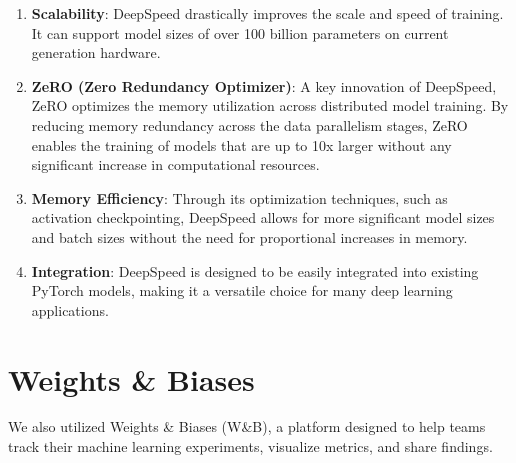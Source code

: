 \documentclass[\main/thesis.tex]{subfiles}
\begin{document}
\begin{enumerate}
    \item \textbf{Scalability}: DeepSpeed drastically improves the scale and speed of training. It can support 
    model sizes of over 100 billion parameters on current generation hardware.
    
    \item \textbf{ZeRO (Zero Redundancy Optimizer)}: A key innovation of DeepSpeed, ZeRO optimizes the memory utilization across 
    distributed model training. By reducing memory redundancy across the data parallelism stages, ZeRO enables the training of models 
    that are up to 10x larger without any significant increase in computational resources.
    
    \item \textbf{Memory Efficiency}: Through its optimization techniques, such as activation checkpointing, 
    DeepSpeed allows for more significant model sizes and batch sizes without the need for proportional increases in memory.
    
    \item \textbf{Integration}: DeepSpeed is designed to be easily integrated into existing PyTorch models, making it a 
    versatile choice for many deep learning applications.
\end{enumerate}


\section{Weights \& Biases}\label{sec:weightsAndBiases}

We also utilized Weights \& Biases (W\&B)\cite{wandb}, a platform designed to help teams track their machine learning experiments, 
visualize metrics, and share findings. 
\end{document}
